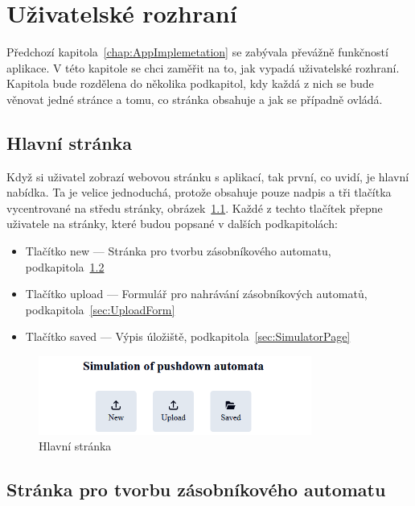 \chapter{Uživatelské rozhraní}\label{chap:UI}

Předchozí kapitola~\ref{chap:AppImplemetation} se zabývala převážně funkčností aplikace. V této kapitole se chci zaměřit na to, jak vypadá uživatelské rozhraní. Kapitola bude rozdělena do několika podkapitol, kdy každá z nich se bude věnovat jedné stránce a tomu, co stránka obsahuje a jak se případně ovládá.

\section{Hlavní stránka}

Když si uživatel zobrazí webovou stránku s aplikací, tak první, co uvidí, je hlavní nabídka. Ta je velice jednoduchá, protože obsahuje pouze nadpis a tři tlačítka vycentrované na středu stránky, obrázek~\ref{fig:UIMainPage}. Každé z techto tlačítek přepne uživatele na stránky, které budou popsané v dalších podkapitolách:
\begin{itemize}
    \item Tlačítko new --- Stránka pro tvorbu zásobníkového automatu, podkapitola~\ref{sec:PDABuilder}
    \item Tlačítko upload --- Formulář pro nahrávání zásobníkových automatů, podkapitola~\ref{sec:UploadForm}
    \item Tlačítko saved --- Výpis úložiště, podkapitola~\ref{sec:SimulatorPage}
\end{itemize}

\begin{figure}[h]
    \centering
    \includegraphics[width=0.8\textwidth]{Figures/PrntScrn_UI_MainMenu.png}
    \caption{Hlavní stránka}\label{fig:UIMainPage}
\end{figure}

\section{Stránka pro tvorbu zásobníkového automatu}\label{sec:PDABuilder}

